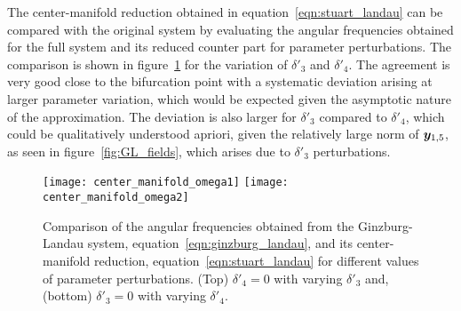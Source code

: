 The center-manifold reduction obtained in equation~\eqref{eqn:stuart_landau} can be compared with the original system by evaluating the angular frequencies obtained for the full system and its reduced counter part for parameter perturbations. The comparison is shown in figure~\ref{fig:omega_parameter_variation} for the variation of $\delta'_{3}$ and $\delta'_{4}$. The agreement is very good close to the bifurcation point with a systematic deviation arising at larger parameter variation, which would be expected given the asymptotic nature of the approximation. The deviation is also larger for $\delta'_{3}$ compared to $\delta'_{4}$, which could be qualitatively understood apriori, given the relatively large norm of $\boldsymbol{y}_{1,5}$, as seen in figure~\ref{fig:GL_fields}, which arises due to $\delta'_{3}$ perturbations. 
\begin{figure}
	\centering
	\texttt{[image: center\_manifold\_omega1]}
	\texttt{[image: center\_manifold\_omega2]}
	\caption{Comparison of the angular frequencies obtained from the Ginzburg-Landau system, equation~\eqref{eqn:ginzburg_landau}, and its center-manifold reduction, equation~\eqref{eqn:stuart_landau} for different values of parameter perturbations. (Top) $\delta'_{4} = 0$ with varying $\delta'_{3}$ and, (bottom) $\delta'_{3} = 0$ with varying $\delta'_{4}$.}
	\label{fig:omega_parameter_variation}
\end{figure} 



